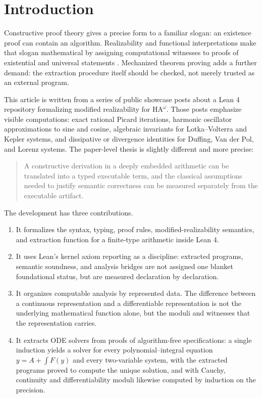\documentclass[11pt,a4paper]{article}
\theoremstyle{definition}
\theoremstyle{remark}
\newcommand{\HAomega}{\ensuremath{\mathrm{HA}^{\omega}}}
\begin{document}
\section{Introduction}

Constructive proof theory gives a precise form to a familiar slogan: an
existence proof can contain an algorithm.  Realizability and functional
interpretations make that slogan mathematical by assigning computational
witnesses to proofs of existential and universal statements
\cite{godel1958,kreisel1959,kohlenbach2008}.  Mechanized theorem proving adds
a further demand: the extraction procedure itself should be checked, not merely
trusted as an external program.

This article is written from a series of public showcase posts about a Lean 4
repository formalizing modified realizability for \HAomega.  Those posts
emphasize visible computations: exact rational Picard iterations, harmonic
oscillator approximations to sine and cosine, algebraic invariants for
Lotka--Volterra and Kepler systems, and dissipative or divergence identities
for Duffing, Van der Pol, and Lorenz systems.  The paper-level thesis is
slightly different and more precise:

\begin{quote}
A constructive derivation in a deeply embedded arithmetic can be translated
into a typed executable term, and the classical assumptions needed to justify
semantic correctness can be measured separately from the executable artifact.
\end{quote}

The development has three contributions.

\begin{enumerate}
\item It formalizes the syntax, typing, proof rules, modified-realizability
semantics, and extraction function for a finite-type arithmetic inside Lean 4.
\item It uses Lean's kernel axiom reporting as a discipline: extracted
programs, semantic soundness, and analysis bridges are not assigned one
blanket foundational status, but are measured declaration by declaration.
\item It organizes computable analysis by represented data.  The difference
between a continuous representation and a differentiable representation is not
the underlying mathematical function alone, but the moduli and witnesses that
the representation carries.
\item It extracts ODE solvers from proofs of algorithm-free specifications: a
single induction yields a solver for every polynomial--integral equation
\(y = A + \int F(y)\) and every two-variable system, with the extracted
programs proved to compute the unique solution, and with Cauchy, continuity and
differentiability moduli likewise computed by induction on the precision.
\end{enumerate}
\end{document}

